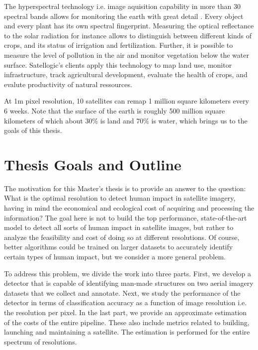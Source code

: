 The hyperspectral technology i.e. image aquisition capability in more than 30 spectral bands allows for monitoring the earth with great detail \parencite{satellogic2019}. Every object and every plant has its own spectral fingerprint. Measuring the optical reflectance to the solar radiation for instance allows to distinguish between different kinds of crops, and its status of irrigation and fertilization. Further, it is possible to measure the level of pollution in the air and monitor vegetation below the water surface. Satellogic's clients apply this technology to map land use, monitor infrastructure, track agricultural development, evaluate the health of crops, and evalute productivity of natural ressources.

At 1m pixel resolution, 10 satellites can remap 1 million square kilometers every 6 weeks. Note that the surface of the earth is roughly 500 million square kilometers of which about 30\% is land and 70\% is water, which brings us to the goals of this thesis.


\section{Thesis Goals and Outline}
The motivation for this Master's thesis is to provide an answer to the question: What is the optimal resolution to detect human impact in satellite imagery, having in mind the economical and ecological cost of acquiring and processing the information? The goal here is not to build the top performance, state-of-the-art model to detect all sorts of human impact in satellite images, but rather to analyze the feasibility and cost of doing so at different resolutions. Of course, better algorithms could be trained on larger datasets to accurately identify certain types of human impact, but we consider a more general problem.

To address this problem, we divide the work into three parts. First, we develop a detector that is capable of identifying man-made structures on two aerial imagery datasets that we collect and annotate. Next, we study the performance of the detector in terms of classification accuracy as a function of image resolution i.e. the resolution per pixel. In the last part, we provide an approximate estimation of the costs of the entire pipeline. These also include metrics related to building, launching and maintaining a satellite. The estimation is performed for the entire spectrum of resolutions.

